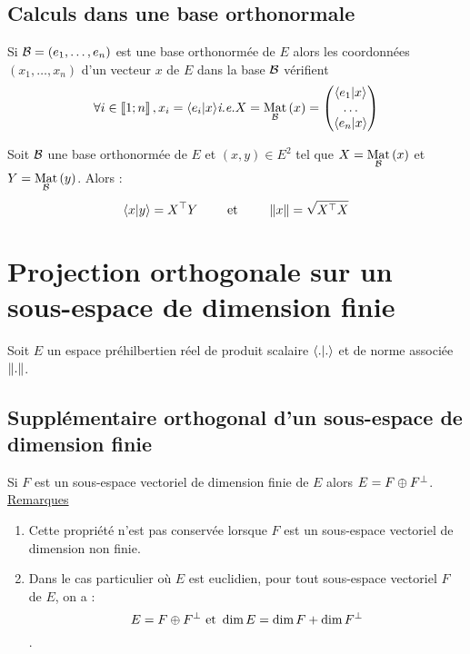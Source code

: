 \subsection{Calculs dans une base orthonormale}
\begin{defprop}
    Si \(\cal{B} = (e_1, \dots , e_n)\) est une base orthonormée de \(E\) alors les coordonnées \((x_1, \dots , x_n)\) d’un vecteur \(x\) de \(E\) dans la base \(\cal{B}\) vérifient
        \[\forall i \in \interventierii{1}{n}, x_i = \scal{e_i}{x}\ie X = \Mat{\cal{B}}{x} =
        \begin{pmatrix}
        \scal{e_1}{x}   \\
        \dots   \\
        \scal{e_n}{x}   
        \end{pmatrix}
        \]
\end{defprop}
\begin{defprop}
    Soit \(\cal{B}\) une base orthonormée de \(E\) et \((x, y) \in E^2\) tel que \(X = \Mat{\cal{B}}{x}\) et \(Y = \Mat{\cal{B}}{y}\).
    Alors :
    \[\scal{x}{y} = \trans{X}Y \qquad\text{ et }\qquad \norme{x} = \sqrt{\trans{X}X}\]
\end{defprop}

\section{Projection orthogonale sur un sous-espace de dimension finie}
    Soit \(E\) un espace préhilbertien réel de produit scalaire \(\scal{.}{.}\) et de norme associée \(\norme{.}\).
\subsection{Supplémentaire orthogonal d’un sous-espace de dimension finie}
\begin{defprop}
    Si \(F\) est un sous-espace vectoriel de dimension finie de \(E\) alors \(E = F \oplus F\ortho\).
    \underline{Remarques}\\
    \begin{enumerate}
        \item Cette propriété n’est pas conservée lorsque \(F\) est un sous-espace vectoriel de dimension non finie.
        \item Dans le cas particulier où \(E\) est euclidien, pour tout sous-espace vectoriel \(F\) de \(E\), on a :
            \[E = F \oplus F\ortho \text{ et }\dim E = \dim F + \dim F\ortho\].
    \end{enumerate}
\end{defprop}

